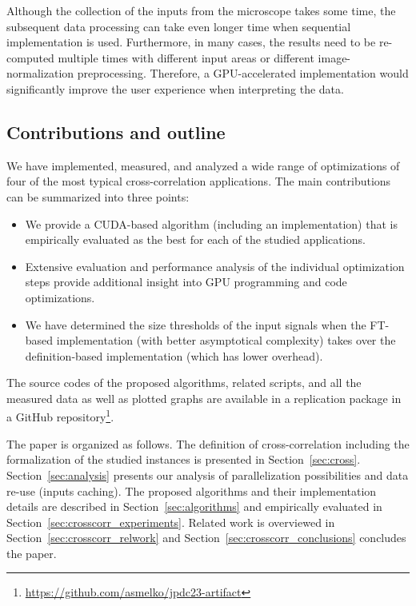 Although the collection of the inputs from the microscope takes some time, the subsequent data processing can take even longer time when sequential implementation is used. Furthermore, in many cases, the results need to be re-computed multiple times with different input areas or different image-normalization preprocessing. Therefore, a GPU-accelerated implementation would significantly improve the user experience when interpreting the data.


\subsection{Contributions and outline}

We have implemented, measured, and analyzed a wide range of optimizations of four of the most typical cross-correlation applications. The main contributions can be summarized into three points:

\begin{itemize}
	\item We provide a CUDA-based algorithm (including an implementation) that is empirically evaluated as the best for each of the studied applications.
	\item Extensive evaluation and performance analysis of the individual optimization steps provide additional insight into GPU programming and code optimizations.
	\item We have determined the size thresholds of the input signals when the FT-based implementation (with better asymptotical complexity) takes over the definition-based implementation (which has lower overhead).
\end{itemize}

The source codes of the proposed algorithms, related scripts, and all the measured data as well as plotted graphs are available in a replication package in a GitHub repository\footnote{\url{https://github.com/asmelko/jpdc23-artifact}}.

The paper is organized as follows.
The definition of cross-correlation including the formalization of the studied instances is presented in Section~\ref{sec:cross}.
Section~\ref{sec:analysis} presents our analysis of parallelization possibilities and data re-use (inputs caching).
The proposed algorithms and their implementation details are described in Section~\ref{sec:algorithms} and empirically evaluated in Section~\ref{sec:crosscorr_experiments}.
Related work is overviewed in Section~\ref{sec:crosscorr_relwork} and Section~\ref{sec:crosscorr_conclusions} concludes the paper.
